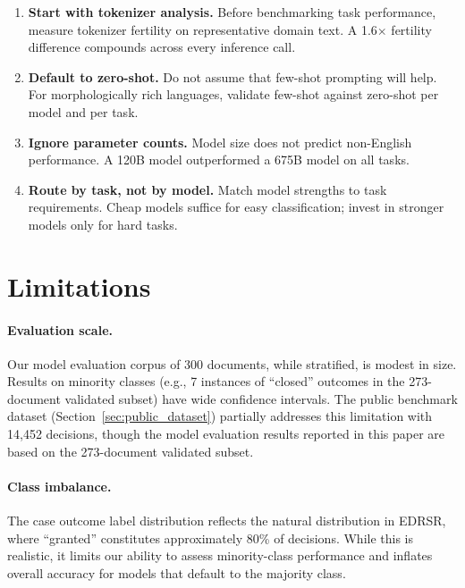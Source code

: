 \documentclass[11pt,a4paper]{article}
\begin{document}
\begin{enumerate}[leftmargin=*]
    \item \textbf{Start with tokenizer analysis.} Before benchmarking task performance, measure tokenizer fertility on representative domain text. A 1.6$\times$ fertility difference compounds across every inference call.
    \item \textbf{Default to zero-shot.} Do not assume that few-shot prompting will help. For morphologically rich languages, validate few-shot against zero-shot per model and per task.
    \item \textbf{Ignore parameter counts.} Model size does not predict non-English performance. A 120B model outperformed a 675B model on all tasks.
    \item \textbf{Route by task, not by model.} Match model strengths to task requirements. Cheap models suffice for easy classification; invest in stronger models only for hard tasks.
\end{enumerate}

\section{Limitations}

\paragraph{Evaluation scale.} Our model evaluation corpus of 300 documents, while stratified, is modest in size. Results on minority classes (e.g., 7 instances of ``closed'' outcomes in the 273-document validated subset) have wide confidence intervals. The public benchmark dataset (Section~\ref{sec:public_dataset}) partially addresses this limitation with 14,452 decisions, though the model evaluation results reported in this paper are based on the 273-document validated subset.

\paragraph{Class imbalance.} The case outcome label distribution reflects the natural distribution in EDRSR, where ``granted'' constitutes approximately 80\% of decisions. While this is realistic, it limits our ability to assess minority-class performance and inflates overall accuracy for models that default to the majority class.
\end{document}
